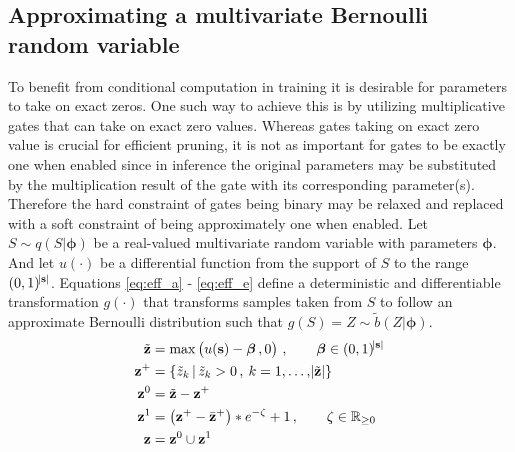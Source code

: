 \documentclass[final,1p,times]{elsarticle}
\begin{document}
\subsection{Approximating a multivariate Bernoulli random variable}
To benefit from conditional computation in training it is desirable for parameters to take on exact zeros. One such way to achieve this is by utilizing multiplicative gates that can take on exact zero values. Whereas gates taking on exact zero value is crucial for efficient pruning, it is not as important for gates to be exactly one when enabled since in inference the original parameters may be substituted by the multiplication result of the gate with its corresponding parameter(s). Therefore the hard constraint of gates being binary may be relaxed and replaced with a soft constraint of being approximately one when enabled. Let $S \sim q(S|\boldsymbol{\phi})$ be a real-valued multivariate random variable with parameters $\boldsymbol{\phi}$. And let $u(\cdot)$ be a differential function from the support of $S$ to the range $(0, 1)^{\abs{\mathbf{s}}}$. Equations \eqref{eq:eff_a} - \eqref{eq:eff_e} define a deterministic and differentiable transformation $g(\cdot)$ that transforms samples taken from $S$ to follow an approximate Bernoulli distribution such that $g(S) = Z \sim \tilde{b}(Z|\boldsymbol{\phi})$.
\begin{align}
\tilde{\mathbf{z}} &= \max \left( u(\mathbf{s}) - \boldsymbol{\beta} \, , 0 \right) \, , \qquad \boldsymbol{\beta} \in (0, 1)^{\abs{\mathbf{s}}} \label{eq:eff_a} \\
\mathbf{z}^+ &= \{ \tilde{z}_k \, | \, \tilde{z}_k > 0 \, , \: k= 1,\ldots , \abs{\tilde{\mathbf{z}}} \} \label{eq:eff_b} \\
\mathbf{z}^0 &= \tilde{\mathbf{z}} - \mathbf{z}^+ \label{eq:eff_c} \\
\mathbf{z}^1 &= \left( \mathbf{z}^+ - \bar{\mathbf{z}}^+ \right) * e^{-\zeta} + 1 \, , \qquad \zeta \in \mathbb{R}_{\geq 0} \label{eq:eff_d} \\
\mathbf{z} &= \mathbf{z}^0 \cup \mathbf{z}^1 \label{eq:eff_e}
\end{align}
\end{document}

